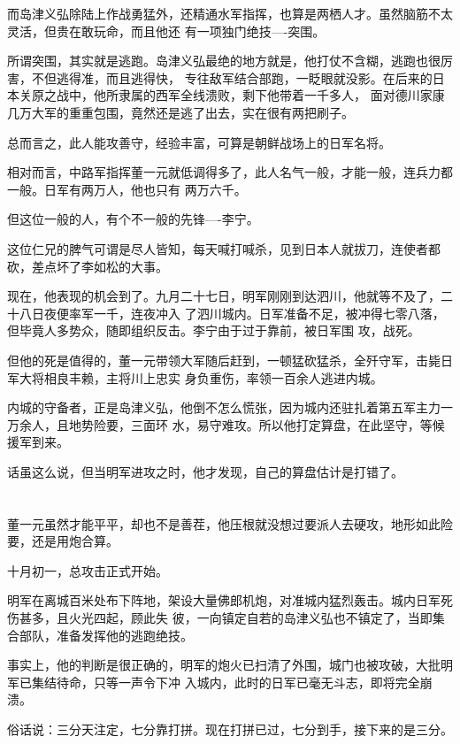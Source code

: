 \documentclass[11pt,a4paper,onecolumn]{article}
\begin{document}
而岛津义弘除陆上作战勇猛外，还精通水军指挥，也算是两栖人才。虽然脑筋不太灵活，但贵在敢玩命，而且他还
有一项独门绝技----突围。

所谓突围，其实就是逃跑。岛津义弘最绝的地方就是，他打仗不含糊，逃跑也很厉害，不但逃得准，而且逃得快，
专往敌军结合部跑，一眨眼就没影。在后来的日本关原之战中，他所隶属的西军全线溃败，剩下他带着一千多人，
面对德川家康几万大军的重重包围，竟然还是逃了出去，实在很有两把刷子。

总而言之，此人能攻善守，经验丰富，可算是朝鲜战场上的日军名将。

相对而言，中路军指挥董一元就低调得多了，此人名气一般，才能一般，连兵力都一般。日军有两万人，他也只有
两万六千。

但这位一般的人，有个不一般的先锋----李宁。

这位仁兄的脾气可谓是尽人皆知，每天喊打喊杀，见到日本人就拔刀，连使者都砍，差点坏了李如松的大事。

现在，他表现的机会到了。九月二十七日，明军刚刚到达泗川，他就等不及了，二十八日夜便率军一千，连夜冲入
了泗川城内。日军准备不足，被冲得七零八落，但毕竟人多势众，随即组织反击。李宁由于过于靠前，被日军围
攻，战死。

但他的死是值得的，董一元带领大军随后赶到，一顿猛砍猛杀，全歼守军，击毙日军大将相良丰赖，主将川上忠实
身负重伤，率领一百余人逃进内城。

内城的守备者，正是岛津义弘，他倒不怎么慌张，因为城内还驻扎着第五军主力一万余人，且地势险要，三面环
水，易守难攻。所以他打定算盘，在此坚守，等候援军到来。

话虽这么说，但当明军进攻之时，他才发现，自己的算盘估计是打错了。

\section[\thesection]{}

董一元虽然才能平平，却也不是善茬，他压根就没想过要派人去硬攻，地形如此险要，还是用炮合算。

十月初一，总攻击正式开始。

明军在离城百米处布下阵地，架设大量佛郎机炮，对准城内猛烈轰击。城内日军死伤甚多，且火光四起，顾此失
彼，一向镇定自若的岛津义弘也不镇定了，当即集合部队，准备发挥他的逃跑绝技。

事实上，他的判断是很正确的，明军的炮火已扫清了外围，城门也被攻破，大批明军已集结待命，只等一声令下冲
入城内，此时的日军已毫无斗志，即将完全崩溃。

俗话说：三分天注定，七分靠打拼。现在打拼已过，七分到手，接下来的是三分。
\end{document}
